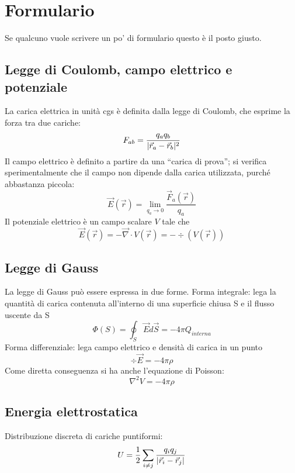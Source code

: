 \documentclass[../main.tex]{subfiles}
\begin{document}
\section{Formulario}
\setcounter{equation}{0}
\renewcommand{\theequation}{F.\arabic{equation}}

Se qualcuno vuole scrivere un po' di formulario questo è il posto giusto.

\subsection{Legge di Coulomb, campo elettrico e potenziale}\label{Preliminari}
La carica elettrica in unit\`a cgs \`e definita dalla legge di Coulomb, che esprime la forza tra due cariche:
\begin{equation}
	\label{Coulomb}
	F_{ab}=\frac{q_aq_b}{\lvert\vec r_a -\vec r_b\rvert^2}
\end{equation}
Il campo elettrico \`e definito a partire da una ``carica di prova''; si verifica sperimentalmente che il campo non dipende dalla carica utilizzata, purch\'e abbastanza piccola:
\begin{equation}
	\label{CampoElettrico}
	\vec E(\vec r)=\lim_{q_a \to 0} \frac{\vec F_a(\vec r)}{q_a}
\end{equation}
Il potenziale elettrico \`e un campo scalare $V$ tale che
\begin{equation}
	\label{Potenziale}
	\vec E(\vec r) = - \vec \nabla \cdot V(\vec r) = - \div (V(\vec r))
\end{equation}

\subsection{Legge di Gauss}\label{Gauss}
La legge di Gauss pu\`o essere espressa in due forme.\newline
Forma integrale: lega la quantit\`a di carica contenuta all'interno di una superficie chiusa S e il flusso uscente da S
\begin{equation}
	\label{GaussIntegrale}
	\Phi(S)= \oint_S \vec E d\vec S=-4\pi Q_{interna}
\end{equation}
Forma differenziale: lega campo elettrico e densit\`a di carica in un punto 
\begin{equation}
	\label{GaussDifferenziale}
	\div \vec E=-4\pi\rho
\end{equation}
Come diretta conseguenza si ha anche l'equazione di Poisson:
\begin{equation}
	\label{Poisson}
	\nabla^2V= -4\pi \rho
\end{equation}

\subsection{Energia elettrostatica}\label{EnergiaElettrostatica}
Distribuzione discreta di cariche puntiformi:
\begin{equation}
	\label{EEDiscreta}
	U= \frac{1}{2} \sum_{i\neq j} \frac{q_iq_j}{\lvert\vec r_i -\vec r_j\rvert}
\end{equation}
\end{document}
